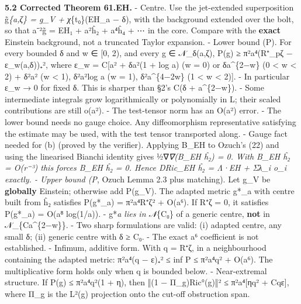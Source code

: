 \documentclass[
  10pt,
]{report}
\begin{document}
\textbf{5.2 Corrected Theorem 61.EH.} - Centre. Use the jet-extended
superposition g̃\emph{\{a,ζ\} = g\_V + χ}\{t₀\}(EH\_a − δ), with the
background extended over the bolt, so that a⁻²g̃ = EH₁ + a²ĥ₂ + a⁴ĥ₄ + ⋯
in the core. Compare with the \textbf{exact} Einstein background, not a
truncated Taylor expansion. - Lower bound (P). For every bounded δ and w
∈ {[}0, 2), and every g ∈ 𝒩\_δ(a,ζ), P(g) ≥
π²a⁴(\textbar R⁺\_pζ\textbar{} − ε\_w(a,δ))₊², where ε\_w = C{[}a² +
δa²(1 + \textbar log a\textbar) (w = 0) or δa\^{}\{2−w\} (0 \textless{}
w \textless{} 2) + δ²a² (w \textless{} 1), δ²a²\textbar log a\textbar{}
(w = 1), δ²a\^{}\{4−2w\} (1 \textless{} w \textless{} 2){]}. - In
particular ε\_w → 0 for fixed δ. This is sharper than §2's C(δ +
a\^{}\{2−w\}). - Some intermediate integrals grow logarithmically or
polynomially in L; their scaled contributions are still o(a²). - The
test-tensor norm has an O(a²) error. - The lower bound needs no gauge
choice. Any diffeomorphism representative satisfying the estimate may be
used, with the test tensor transported along. - Gauge fact needed for
(b) (proved by the verifier). Applying B\_EH to Ozuch's (22) and using
the linearised Bianchi identity gives ½∇\emph{∇(B\_EH ĥ₂) = 0. With
B\_EH ĥ₂ = O(r⁻³) this forces B\_EH ĥ₂ = 0. Hence DRic\_EH ĥ₂ = Λ·EH +
Σλ\_i o\_i exactly. - Upper bound (P}, Ozuch Lemma 2.3 plus matching).
Let g\_V be \textbf{globally} Einstein; otherwise add P(g\_V). The
adapted metric g*\_a with centre built from ĥ₂ satisfies P(g*\_a) =
π²a⁴\textbar R⁺ζ\textbar² + O(a⁶). If R⁺ζ = 0, it satisfies P(g*\_a) =
O(a⁸ log(1/a)). - g*\emph{a lies in 𝒩}\{C₀\} of a generic centre,
\textbf{not} in 𝒩\_\{Ca\^{}\{2−w\}\}. - Two sharp formulations are
valid: (i) adapted centre, any small δ; (ii) generic centre with δ ≥ C₀.
- The exact a⁶ coefficient is not established. - Infimum, additive form.
With q = \textbar R⁺ζ\textbar, in a neighbourhood containing the adapted
metric: π²a⁴(q − ε)₊² ≤ inf P ≤ π²a⁴q² + O(a⁶). The multiplicative form
holds only when q is bounded below. - Near-extremal structure. If P(g) ≤
π²a⁴q²(1 + η), then ‖(1 − Π\_g)Ric°(g)‖² ≤ π²a⁴{[}ηq² + Cqε{]}, where
Π\_g is the L²(g) projection onto the cut-off obstruction span.
\end{document}
